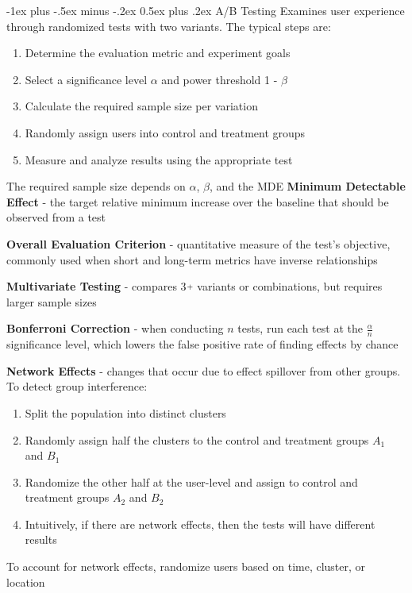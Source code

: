 \documentclass[10pt,landscape]{article}
\makeatletter
\newcommand{\plus}{\raisebox{.3\height}{\scalebox{.7}{+}}}
\renewcommand{\section}{\@startsection{section}{1}{0mm}%
                                {-1ex plus -.5ex minus -.2ex}%
                                {0.5ex plus .2ex}%
                                {\normalfont\large\bfseries}}
\makeatother
\begin{document}
\begin{multicols}{3}
\section{A/B Testing}
Examines user experience through randomized tests with two variants.
The typical steps are:
\begin{enumerate}[leftmargin=5mm]
    \itemsep -.4mm
    \item Determine the evaluation metric and experiment goals
    \item Select a significance level $\alpha$ and power threshold 1 - $\beta$
    \item Calculate the required sample size per variation
    \item Randomly assign users into control and treatment groups
    \item Measure and analyze results using the appropriate test
\end{enumerate}

The required sample size depends on $\alpha$, $\beta$, and the MDE
\textbf{Minimum Detectable Effect} - the target relative minimum increase over the baseline that should be observed from a test
\vspace{.5mm}

\textbf{Overall Evaluation Criterion} - quantitative measure of the test's objective, commonly used when short and long-term metrics have inverse relationships
\vspace{.7mm}

\textbf{Multivariate Testing} - compares 3$\plus$ variants or combinations, but requires larger sample sizes

\textbf{Bonferroni Correction} - when conducting $n$ tests,
run each test at the $\frac{\alpha}{n}$ significance level, which lowers the false positive rate of finding effects by chance
\vspace{.7mm}

\textbf{Network Effects} - changes that occur due to effect spillover from other groups. To detect group interference:
\begin{enumerate}[leftmargin=5mm]
    \itemsep -.4mm
    \item Split the population into distinct clusters
    \item Randomly assign half the clusters to the control and treatment groups $A_1$ and $B_1$
    \item Randomize the other half at the user-level and assign to control and treatment groups
    $A_2$ and $B_2$
    \item Intuitively, if there are network effects, then the tests will have different results
\end{enumerate}
To account for network effects, randomize users based on time, cluster, or location
\smallskip


\end{multicols}
\end{document}
